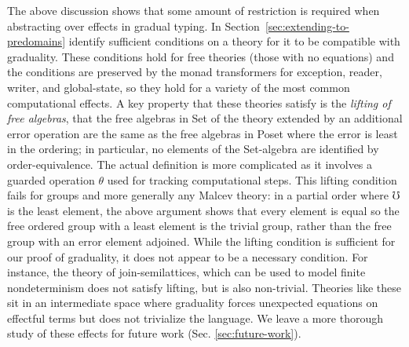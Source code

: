 \documentclass[acmsmall,screen,review,anonymous]{acmart}
\theoremstyle{remark}
\newif\ifdraft
\renewcommand{\max}[1]{\ifdraft{\color{blue}[{\bf Max says}: #1]}\fi}
\begin{document}
The above discussion shows that some amount of restriction is required
when abstracting over effects in gradual typing. In
Section~\ref{sec:extending-to-predomains} identify sufficient
conditions on a theory for it to be compatible with graduality. These
conditions hold for free theories (those with no equations) and the
conditions are preserved by the monad transformers for exception,
reader, writer, and global-state, so they hold for a variety of the
most common computational effects. A key property that these theories
satisfy is the \emph{lifting of free algebras}, that the free algebras
in Set of the theory extended by an additional error operation are the
same as the free algebras in Poset where the error is least in the
ordering; in particular, no elements of the Set-algebra are identified
by order-equivalence. The actual definition is more complicated as it
involves a guarded operation $\theta$ used for tracking computational
steps.
%
%
%
This lifting condition fails for groups and more generally any Malcev
theory: in a partial order where $\mho$ is the least element, the
above argument shows that every element is equal so the free ordered
group with a least element is the trivial group, rather than the free
group with an error element adjoined.
%
%
%
While the lifting condition is sufficient for our proof of graduality,
it does not appear to be a necessary condition. For instance, the theory of join-semilattices, which can be used to model finite nondeterminism does not satisfy lifting, but is also non-trivial. Theories like these sit in an intermediate space where graduality forces unexpected equations on effectful terms but does not trivialize the language. We leave a more thorough study of these effects for
future work (Sec. \ref{sec:future-work}).
\end{document}
